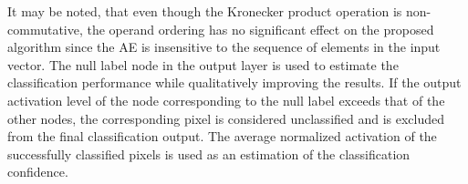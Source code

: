 It may be noted, that even though the Kronecker product operation is non-commutative, the operand ordering has no significant effect on the proposed algorithm since the AE is insensitive to the sequence of elements in the input vector. 
The null label node in the output layer is used to estimate the classification performance while qualitatively improving the results. If the output activation level of the node corresponding to the null label exceeds that of the other nodes, the corresponding pixel is considered unclassified and is excluded from the final classification output. The average normalized activation  of the successfully classified pixels is used as an estimation of the classification confidence. 








